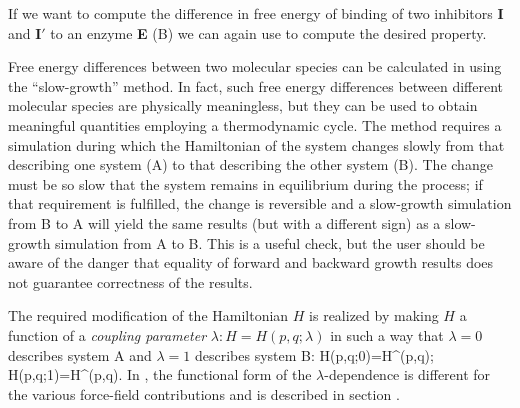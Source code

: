 {If we want to compute the difference in free energy of binding of two
inhibitors {\bf I} and {\bf I$\prime$} to an enzyme {\bf E} (B)
we can again use  to compute the desired property.

\newcommand{\sA}{^{\mathrm{A}}}
\newcommand{\sB}{^{\mathrm{B}}}
Free energy differences between two molecular species can
be calculated in {\gromacs} using the ``slow-growth'' method. In fact,
such free energy differences between different molecular species are
physically meaningless, but they can be used to obtain meaningful
quantities employing a thermodynamic cycle.
The method requires a simulation during which the Hamiltonian of the
system changes slowly from that describing one system (A) to that
describing the other system (B). The change must be so slow that the
system remains in equilibrium during the process; if that requirement
is fulfilled, the change is reversible and a slow-growth simulation from B to A
will yield the same results (but with a different sign) as a slow-growth
simulation from A to B. This is a useful check, but the user should be
aware of the danger that equality of forward and backward growth results does
not guarantee correctness of the results.

The required modification of the Hamiltonian $H$ is realized by making
$H$ a function of a \textit{coupling parameter} $\lambda:
H=H(p,q;\lambda)$ in such a way that $\lambda=0$ describes system A
and $\lambda=1$ describes system B: 
\beq
  H(p,q;0)=H\sA (p,q);~~~~ H(p,q;1)=H\sB (p,q).
\eeq
In {\gromacs}, the functional form of the $\lambda$-dependence is
different for the various force-field contributions and is described
in section .

}
